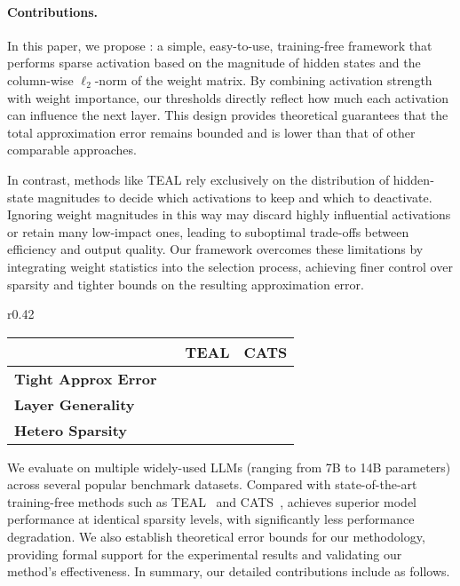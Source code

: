 \paragraph{Contributions.} In this paper, we propose \algacro{}: a simple, easy-to-use, training-free framework that performs sparse activation based on the magnitude of hidden states and the column-wise $\ell_2$-norm of the weight matrix. By combining activation strength with weight importance, our thresholds directly reflect how much each activation can influence the next layer. This design provides theoretical guarantees that the total approximation error remains bounded and is lower than that of other comparable approaches. 

In contrast, methods like TEAL rely exclusively on the distribution of hidden‐state magnitudes to decide which activations to keep and which to deactivate. Ignoring weight magnitudes in this way may discard highly influential activations or retain many low‐impact ones, leading to suboptimal trade-offs between efficiency and output quality. Our framework overcomes these limitations by integrating weight statistics into the selection process, achieving finer control over sparsity and tighter bounds on the resulting approximation error.


\begin{wraptable}{r}{0.42\textwidth}
\centering
\scriptsize
	\vspace{-3.5mm}
	\begin{tabular}{lccc}
		\toprule
		& \textbf{\algacro{}} & \textbf{TEAL}  & \textbf{CATS}  \\
		\midrule
		\textbf{Tight Approx Error}  & {\cmark} & \xmark & \xmark \\
		\textbf{Layer Generality} & \cmark & \cmark & \xmark  \\
		\textbf{Hetero Sparsity} & \cmark & \cmark & \xmark  \\
		\bottomrule
	\end{tabular}
	\vspace{-3mm}
\end{wraptable}
We evaluate \algacro{} on multiple widely-used LLMs (ranging from 7B to 14B parameters) across several popular benchmark datasets. Compared with state-of-the-art training-free methods such as TEAL~\citep{liu2024trainingfreeactivationsparsitylarge} and CATS~\citep{lee2024catscontextuallyawarethresholdingsparsity}, achieves superior model performance at identical sparsity levels, with significantly less performance degradation. 
We also establish theoretical error bounds for our methodology,  providing formal support for the experimental results and validating our method's effectiveness. In summary, our detailed contributions include as follows.


